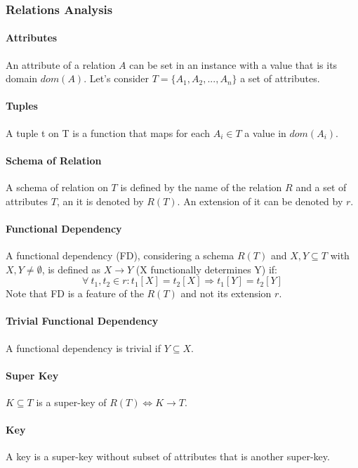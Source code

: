 \documentclass[12pt, a4paper]{report}
\begin{document}
\subsubsection*{Relations Analysis}

\paragraph{Attributes}
An attribute of a relation $A$ can be set in an instance with a value that is its domain $dom(A)$.
Let's consider $T = \{A_1, A_2, ..., A_n\}$ a set of attributes.

\paragraph{Tuples}
A tuple t on T is a function that maps for each $A_i \in T$ a value in $dom(A_i)$.

\paragraph{Schema of Relation}
A schema of relation on $T$ is defined by the name of the relation $R$ and a set of attributes $T$,
an it is denoted by $R(T)$. An extension of it can be denoted by $r$.

\paragraph{Functional Dependency}
A functional dependency (FD), considering a schema $R(T)$ and $X, Y \subseteq T$ with $X, Y \neq \emptyset$,
is defined as $X \rightarrow Y$ (X functionally determines Y) if:
$$
\forall \ t_1, t_2 \in r : t_1[X] = t_2[X] \Rightarrow t_1[Y] = t_2[Y]
$$
Note that FD is a feature of the $R(T)$ and not its extension $r$.

\paragraph{Trivial Functional Dependency}
A functional dependency is trivial if $Y \subseteq X$.

\paragraph{Super Key}
$K \subseteq T$ is a super-key of $R(T) \Leftrightarrow K \rightarrow T$.

\paragraph{Key}
A key is a super-key without subset of attributes that is another super-key.
\end{document}
